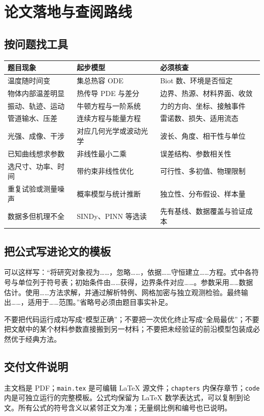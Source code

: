 \documentclass[UTF8,zihao=-4,openany,oneside,fontset=windows]{ctexbook}
\begin{document}
\chapter{论文落地与查阅路线}
\section{按问题找工具}
\begin{longtable}{p{}p{}p{}}
\toprule 题目现象 & 起步模型 & 必须核查 \\ \midrule
温度随时间变 & 集总热容 ODE & Biot 数、环境是否恒定 \\
物体内部温差明显 & 热传导 PDE 与差分 & 边界、热源、材料界面、收敛 \\
振动、轨迹、运动 & 牛顿方程与一阶系统 & 力的方向、坐标、接触事件 \\
管道输水、压差 & 连续方程与能量方程 & 雷诺数、损失、适用流态 \\
光强、成像、干涉 & 对应几何光学或波动光学 & 波长、角度、相干性与单位 \\
已知曲线想求参数 & 非线性最小二乘 & 误差结构、参数相关性 \\
选尺寸、功率、时间 & 带约束非线性优化 & 可行性、多初值、物理限制 \\
重复试验或测量噪声 & 概率模型与统计推断 & 独立性、分布假设、样本量 \\
数据多但机理不全 & SINDy、PINN 等选读 & 先有基线、数据覆盖与验证成本 \\
\bottomrule
\end{longtable}

\section{把公式写进论文的模板}
可以这样写：“将研究对象视为……，忽略……，依据……守恒建立……方程。式中各符号与单位列于符号表；初始条件由……获得，边界条件对应……。参数采用……数据估计。使用……方法求解，并通过解析特例、网格加密与独立观测检验。最终输出……，适用于……范围。”省略号必须由题目事实补足。

不要把代码运行成功写成“模型正确”；不要把一次优化终止写成“全局最优”；不要把文献中的某个材料参数直接搬到另一材料；不要把未经验证的前沿模型包装成必然优于经典方法。

\section{交付文件说明}
主文档是 PDF；\texttt{main.tex} 是可编辑 LaTeX 源文件；\texttt{chapters} 内保存章节；\texttt{code} 内是可独立运行的完整模板。公式均保留为 LaTeX 数学表达式，可以复制到论文。所有公式的符号含义以紧邻正文为准；无量纲比例和编号也已说明。
\end{document}
